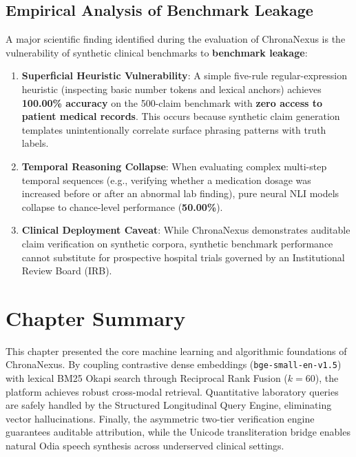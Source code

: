 \subsection{Empirical Analysis of Benchmark Leakage}
A major scientific finding identified during the evaluation of ChronaNexus is the vulnerability of synthetic clinical benchmarks to \textbf{benchmark leakage}:
\begin{enumerate}
  \item \textbf{Superficial Heuristic Vulnerability}: A simple five-rule regular-expression heuristic (inspecting basic number tokens and lexical anchors) achieves \textbf{100.00\% accuracy} on the 500-claim benchmark with \textbf{zero access to patient medical records}. This occurs because synthetic claim generation templates unintentionally correlate surface phrasing patterns with truth labels.
  \item \textbf{Temporal Reasoning Collapse}: When evaluating complex multi-step temporal sequences (e.g., verifying whether a medication dosage was increased before or after an abnormal lab finding), pure neural NLI models collapse to chance-level performance (\textbf{50.00\%}).
  \item \textbf{Clinical Deployment Caveat}: While ChronaNexus demonstrates auditable claim verification on synthetic corpora, synthetic benchmark performance cannot substitute for prospective hospital trials governed by an Institutional Review Board (IRB).
\end{enumerate}

\section{Chapter Summary}

This chapter presented the core machine learning and algorithmic foundations of ChronaNexus. By coupling contrastive dense embeddings (\texttt{bge-small-en-v1.5}) with lexical BM25 Okapi search through Reciprocal Rank Fusion ($k=60$), the platform achieves robust cross-modal retrieval. Quantitative laboratory queries are safely handled by the Structured Longitudinal Query Engine, eliminating vector hallucinations. Finally, the asymmetric two-tier verification engine guarantees auditable attribution, while the Unicode transliteration bridge enables natural Odia speech synthesis across underserved clinical settings.
